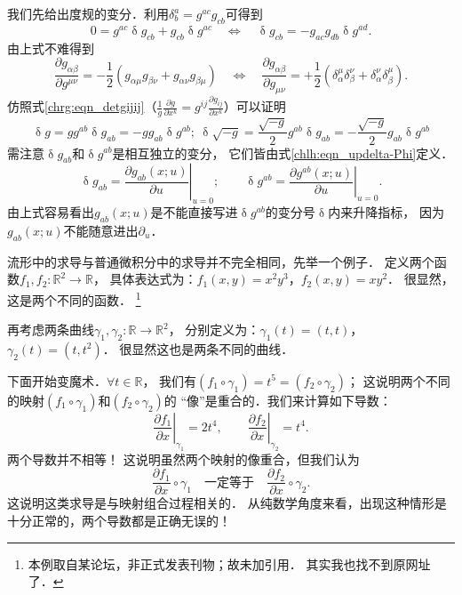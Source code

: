 我们先给出度规的变分．利用$\delta^a_b = g^{ac} g_{cb}$可得到
\begin{equation}\label{chlh:eqn_delta-gab}
    0= g^{ac} \updelta g_{cb} + g_{cb}\updelta  g^{ac}
    \quad \Leftrightarrow \quad
    \updelta g_{cb} = -g_{ac} g_{db} \updelta  g^{ad} .
\end{equation}
由上式不难得到
\begin{equation}\label{chlh:eqn_dgdg}
    \frac{\partial g_{\alpha\beta}}{\partial g^{\mu\nu}}
    =-\frac{1}{2}\left(g_{\alpha\mu}g_{\beta\nu}+g_{\alpha\nu}g_{\beta\mu}\right)
    \quad \Leftrightarrow \quad
    \frac{\partial g_{\alpha\beta}}{\partial g_{\mu\nu}}
    =+\frac{1}{2}\left(\delta_\alpha^\mu \delta_\beta^\nu
    +\delta_\alpha^\nu \delta_\beta^\mu \right) .
\end{equation}
仿照式\eqref{chrg:eqn_detgijij}（$\frac{1}{g}\frac{\partial g}{\partial x^k}
= g^{ij} \frac{\partial g_{ij}}{\partial x^k}$）可以证明
\begin{equation}\label{chlh:eqn_delta-g}
    \updelta g = g g^{ab} \updelta g_{ab} = - g g_{ab} \updelta g^{ab};
    \ \updelta \sqrt{-g} = \frac{\sqrt{-g}}{2} g^{ab} \updelta g_{ab}
    = - \frac{\sqrt{-g}}{2} g_{ab} \updelta g^{ab}
\end{equation}
需注意$\updelta g_{ab}$和$\updelta g^{ab}$是相互独立的变分，
它们皆由式\eqref{chlh:eqn_updelta-Phi}定义．
\begin{equation}
    \updelta g_{ab} = \left.\frac{\partial g_{ab}(x;u) }{\partial u}\right|_{u=0} ; \qquad
    \updelta g^{ab} = \left.\frac{\partial g^{ab}(x;u) }{\partial u}\right|_{u=0} .
\end{equation}
由上式容易看出$g_{ab}(x;u)$是不能直接写进$\updelta g^{ab}$的变分号$\updelta$内来升降指标，
因为$g_{ab}(x;u)$不能随意进出$\partial_u$．



流形中的求导与普通微积分中的求导并不完全相同，先举一个例子．
定义两个函数$f_1,f_2: \mathbb{R}^2 \to \mathbb{R}$，
具体表达式为：$f_1(x,y)=x^2 y^3$，$f_2(x,y)=x y^2$．
很显然，这是两个不同的函数．
{\footnote{本例取自某论坛，非正式发表刊物；故未加引用．
        其实我也找不到原网址了．}}

再考虑两条曲线$\gamma_1,\gamma_2:\mathbb{R} \to \mathbb{R}^2$，
分别定义为：$\gamma_1(t)=(t,t)$，$\gamma_2(t)=(t,t^2)$．
很显然这也是两条不同的曲线．

下面开始变魔术．$\forall t\in \mathbb{R}$，
我们有$(f_1\circ \gamma_1) = t^5=(f_2\circ \gamma_2)$；
这说明两个不同的映射$(f_1\circ \gamma_1)$和$(f_2\circ \gamma_2)$的
“像”是重合的．我们来计算如下导数：
\begin{equation}\label{chlh:eqn_f1dxf2dx}
    \left.\frac{\partial f_1}{\partial x}\right|_{\gamma_1} = 2t^4 ,\qquad
    \left.\frac{\partial f_2}{\partial x}\right|_{\gamma_2} = t^4 .
\end{equation}
两个导数并不相等！
这说明虽然两个映射的像重合，但我们认为
\begin{equation}\label{chlh:eqn_f1f2}
    \frac{\partial f_1}{\partial x}\circ \gamma_1
    \quad \text{一定等于}  \quad
    \frac{\partial f_2}{\partial x}\circ \gamma_2 .
\end{equation}
这说明这类求导是与映射组合过程相关的．
从纯数学角度来看，出现这种情形是十分正常的，两个导数都是正确无误的！



